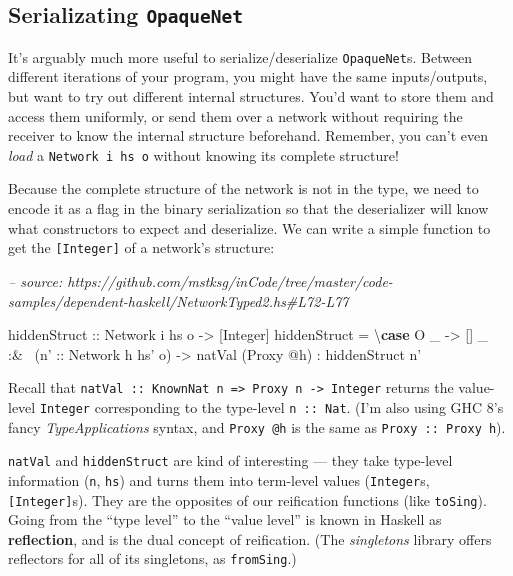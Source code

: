 \documentclass[]{article}
\newenvironment{Shaded}{}{}
\newcommand{\CommentTok}[1]{\textcolor[rgb]{0.38,0.63,0.69}{\textit{#1}}}
\newcommand{\DataTypeTok}[1]{\textcolor[rgb]{0.56,0.13,0.00}{#1}}
\newcommand{\FunctionTok}[1]{\textcolor[rgb]{0.02,0.16,0.49}{#1}}
\newcommand{\KeywordTok}[1]{\textcolor[rgb]{0.00,0.44,0.13}{\textbf{#1}}}
\newcommand{\NormalTok}[1]{#1}
\newcommand{\OtherTok}[1]{\textcolor[rgb]{0.00,0.44,0.13}{#1}}
\begin{document}
\hypertarget{serializating-opaquenet}{%
\subsection{\texorpdfstring{Serializating
\texttt{OpaqueNet}}{Serializating OpaqueNet}}\label{serializating-opaquenet}}

It's arguably much more useful to serialize/deserialize \texttt{OpaqueNet}s.
Between different iterations of your program, you might have the same
inputs/outputs, but want to try out different internal structures. You'd want to
store them and access them uniformly, or send them over a network without
requiring the receiver to know the internal structure beforehand. Remember, you
can't even \emph{load} a \texttt{Network\ i\ hs\ o} without knowing its complete
structure!

Because the complete structure of the network is not in the type, we need to
encode it as a flag in the binary serialization so that the deserializer will
know what constructors to expect and deserialize. We can write a simple function
to get the \texttt{{[}Integer{]}} of a network's structure:

\begin{Shaded}
\begin{Highlighting}[]
\CommentTok{-- source: https://github.com/mstksg/inCode/tree/master/code-samples/dependent-haskell/NetworkTyped2.hs#L72-L77}

\OtherTok{hiddenStruct ::} \DataTypeTok{Network}\NormalTok{ i hs o }\OtherTok{->}\NormalTok{ [}\DataTypeTok{Integer}\NormalTok{]}
\NormalTok{hiddenStruct }\FunctionTok{=}\NormalTok{ \textbackslash{}}\KeywordTok{case}
    \DataTypeTok{O}\NormalTok{ _    }\OtherTok{->}\NormalTok{ []}
\NormalTok{    _ }\FunctionTok{:&~}\NormalTok{ (}\OtherTok{n' ::} \DataTypeTok{Network}\NormalTok{ h hs' o)}
           \OtherTok{->}\NormalTok{ natVal (}\DataTypeTok{Proxy} \FunctionTok{@}\NormalTok{h)}
            \FunctionTok{:}\NormalTok{ hiddenStruct n'}
\end{Highlighting}
\end{Shaded}

Recall that
\texttt{natVal\ ::\ KnownNat\ n\ =\textgreater{}\ Proxy\ n\ -\textgreater{}\ Integer}
returns the value-level \texttt{Integer} corresponding to the type-level
\texttt{n\ ::\ Nat}. (I'm also using GHC 8's fancy \emph{TypeApplications}
syntax, and \texttt{Proxy\ @h} is the same as \texttt{Proxy\ ::\ Proxy\ h}).

\texttt{natVal} and \texttt{hiddenStruct} are kind of interesting --- they take
type-level information (\texttt{n}, \texttt{hs}) and turns them into term-level
values (\texttt{Integer}s, \texttt{{[}Integer{]}}s). They are the opposites of
our reification functions (like \texttt{toSing}). Going from the ``type level''
to the ``value level'' is known in Haskell as \textbf{reflection}, and is the
dual concept of reification. (The \emph{singletons} library offers reflectors
for all of its singletons, as \texttt{fromSing}.)
\end{document}
